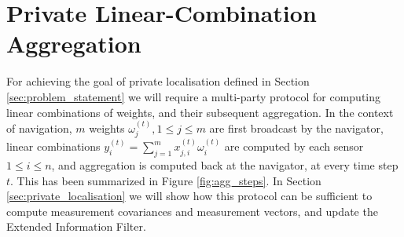 \documentclass[twocolumn]{autart}
\begin{document}
% 
% 

\section{Private Linear-Combination Aggregation} \label{sec:lcao_definition}
For achieving the goal of private localisation defined in Section \ref{sec:problem_statement} we will require a multi-party protocol for computing linear combinations of weights, and their subsequent aggregation. In the context of navigation, $m$ weights $\omega_j^{(t)}, 1 \leq j \leq m$ are first broadcast by the navigator, linear combinations $y^{(t)}_i=\sum^m_{j=1}x_{j,i}^{(t)}\omega_i^{(t)}$ are computed by each sensor $1\leq i\leq n$, and aggregation is computed back at the navigator, at every time step $t$. This has been summarized in Figure \ref{fig:agg_steps}. In Section \ref{sec:private_localisation} we will show how this protocol can be sufficient to compute measurement covariances and measurement vectors, and update the Extended Information Filter.
\end{document}
